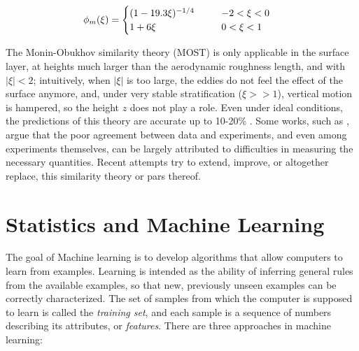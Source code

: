 \documentclass[a4paper]{book}
\begin{document}
\begin{align}
\phi_m(\xi)&=\begin{cases}
\label{eq:phi_m_coeff}
\mathrlap{(1-19.3\xi)^{-1/4}} \hphantom{0.95(1-11.6\xi)^{-1/2}} & -2<\xi<0 \\
1+6\xi & 0<\xi<1\\
\end{cases}
\end{align}

The Monin-Obukhov similarity theory (MOST) is only applicable in the surface layer, at heights much larger than the aerodynamic roughness length, and with $\vert\xi\vert<2$; intuitively, when $\vert\xi\vert$ is too large, the eddies do not feel the effect of the surface anymore, and, under very stable stratification ($\xi>>1$), vertical motion is hampered, so the height $z$ does not play a role. Even under ideal conditions, the predictions of this theory are accurate up to 10-20\% \citep{50years}. Some works, such as \cite{flux_prof_measure_issues}, argue that the poor agreement between data and experiments, and even among experiments themselves, can be largely attributed to difficulties in measuring the necessary quantities. Recent attempts \citep{sheba_phim,most_teal,Wilson2008,aerodynamic_fluxes} try to extend, improve, or altogether replace, this similarity theory or pars thereof.

\section{Statistics and Machine Learning}
\label{sec:ml}
The goal of Machine learning is to develop algorithms that allow computers to learn from examples. Learning is intended as the ability of inferring general rules from the available examples, so that new, previously unseen examples can be correctly characterized. The set of samples from which the computer is supposed to learn is called the \emph{training set}, and each sample is a sequence of numbers describing its attributes, or \emph{features}. There are three approaches in machine learning:
\end{document}
